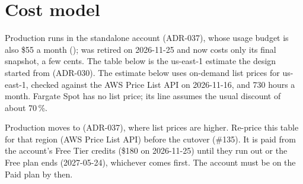 \chapter{Cost model}\label{ch:cost}

Production runs in the standalone account (ADR-037), whose usage budget is also \$55 a month
();  was retired on 2026-11-25 and now costs only its
final snapshot, a few cents. The table below is the us-east-1 estimate the design started from
(ADR-030). The
estimate below uses on-demand list prices for us-east-1, checked against the AWS Price List API on
2026-11-16, and 730 hours a month. Fargate Spot has no list price; its line assumes the usual
discount of about 70\,\%.

\begin{todo}
  Production moves to  (ADR-037), where list prices are higher. Re-price
  this table for that region (AWS Price List API) before the cutover (\#135). It is paid from the
  account's Free Tier credits (\$180 on 2026-11-25) until they run out or the Free plan ends
  (2027-05-24), whichever comes first. The account must be on the Paid plan by then.
\end{todo}

